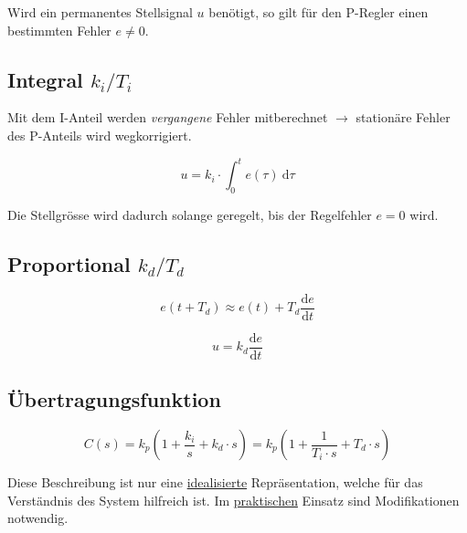 \documentclass[
  10pt,
  a4paper,
  german]{article}
\numberwithin{equation}{section}
\begin{document}
\begin{multicols}{2}
\begin{tcolorbox}
Wird ein permanentes Stellsignal \(u\) benötigt, so gilt für den
P-Regler einen bestimmten Fehler \(e \neq 0\).

\end{tcolorbox}

\hypertarget{k_it_i}{%
\subsection{\texorpdfstring{\textcolor{NavyBlue}{Integral}
\(k_i/T_i\)}{ k\_i/T\_i}}\label{k_it_i}}

Mit dem I-Anteil werden \emph{vergangene} Fehler mitberechnet
\(\rightarrow\) stationäre Fehler des P-Anteils wird wegkorrigiert.

\[
u = k_i\cdot\int_0^t e(\tau)\ {\text{d}\tau}
\]

Die Stellgrösse wird dadurch solange geregelt, bis der Regelfehler
\(e=0\) wird.

\hypertarget{k_dt_d}{%
\subsection{\texorpdfstring{\textcolor{OliveGreen}{Proportional}
\(k_d/T_d\)}{ k\_d/T\_d}}\label{k_dt_d}}

\[
e(t+T_d)\approx e(t)+T_d \frac{\text{d}e}{\text{d}t}
\]

\[
u = k_d \frac{\text{d}e}{\text{d}t}
\]

\hypertarget{uxfcbertragungsfunktion}{%
\subsection{Übertragungsfunktion}\label{uxfcbertragungsfunktion}}

\[
C(s)=k_p\left(1+\frac{k_i}{s}+k_d\cdot s\right)=k_p\left(1+\frac{1}{T_i\cdot s}+T_d\cdot s\right)
\]

\begin{tcolorbox}[enhanced jigsaw, rightrule=.15mm, toprule=.15mm, leftrule=.75mm, opacityback=0, title=\textcolor{quarto-callout-important-color}{\faExclamation}\hspace{0.5em}{Wichtig}, opacitybacktitle=0.6, colback=white, arc=.35mm, bottomrule=.15mm, colframe=quarto-callout-important-color-frame, coltitle=black, bottomtitle=1mm, left=2mm, toptitle=1mm, breakable, titlerule=0mm, colbacktitle=quarto-callout-important-color!10!white]

Diese Beschreibung ist nur eine \ul{idealisierte} Repräsentation, welche
für das Verständnis des System hilfreich ist. Im \ul{praktischen}
Einsatz sind Modifikationen notwendig.


\end{tcolorbox}
\end{multicols}
\end{document}
